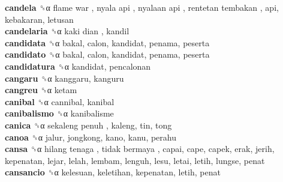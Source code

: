 \textbf{candela} ␝α   flame war ,  nyala api ,  nyalaan api ,  rentetan tembakan , api, kebakaran, letusan  \\
\textbf{candelaria} ␝α   kaki dian , kandil  \\
\textbf{candidata} ␝α  bakal, calon, kandidat, penama, peserta  \\
\textbf{candidato} ␝α  bakal, calon, kandidat, penama, peserta  \\
\textbf{candidatura} ␝α  kandidat, pencalonan  \\
\textbf{cangaru} ␝α  kanggaru, kanguru  \\
\textbf{cangreu} ␝α  ketam  \\
\textbf{canibal} ␝α  cannibal, kanibal  \\
\textbf{canibalismo} ␝α  kanibalisme  \\
\textbf{canica} ␝α   sekaleng penuh , kaleng, tin, tong  \\
\textbf{canoa} ␝α  jalur, jongkong, kano, kanu, perahu  \\
\textbf{cansa} ␝α   hilang tenaga ,  tidak bermaya , capai, cape, capek, erak, jerih, kepenatan, lejar, lelah, lembam, lenguh, lesu, letai, letih, lungse, penat  \\
\textbf{cansancio} ␝α  kelesuan, keletihan, kepenatan, letih, penat  \\
